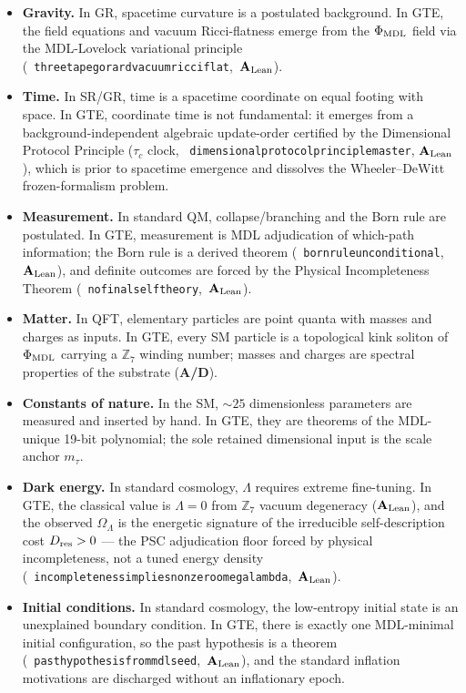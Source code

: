 \documentclass[11pt]{article}
\newcommand{\lean}[1]{%
  \penalty-100
  \begingroup\def\_{\textunderscore\allowbreak}\texttt{#1}\endgroup}
\newcommand{\CatAL}{\ensuremath{\textbf{A}_{\rm Lean}}}
\newcommand{\CatAD}{\textbf{A/D}}
\begin{document}
\begin{tcolorbox}[colback=blue!4,colframe=blue!50!black,breakable,
  title={GTE: Conceptual Reframings of Fundamental Physics}]
\small
\begin{itemize}[leftmargin=1.4em,itemsep=4pt]
\item \textbf{Gravity.}  In GR, spacetime curvature is a postulated background.  In
  GTE, the field equations and vacuum Ricci-flatness emerge from the
  $\Phi_{\rm MDL}$ field via the MDL-Lovelock variational principle
  \mbox{(\lean{three\_tape\_gorard\_vacuum\_ricci\_flat}, \CatAL)}.
\item \textbf{Time.}  In SR/GR, time is a spacetime coordinate on equal footing with
  space.  In GTE, coordinate time is not fundamental: it emerges from a
  background-independent algebraic update-order certified by the Dimensional
  Protocol Principle ($\tau_c$ clock,
  \mbox{\lean{dimensional\_protocol\_principle\_master}}, \CatAL), which is prior to
  spacetime emergence and dissolves the Wheeler--DeWitt frozen-formalism problem.
\item \textbf{Measurement.}  In standard QM, collapse/branching and the Born rule are
  postulated.  In GTE, measurement is MDL adjudication of which-path information;
  the Born rule is a derived theorem
  \mbox{(\lean{born\_rule\_unconditional}, \CatAL)}, and definite outcomes are forced
  by the Physical Incompleteness Theorem
  \mbox{(\lean{no\_final\_self\_theory}, \CatAL)}.
\item \textbf{Matter.}  In QFT, elementary particles are point quanta with masses and
  charges as inputs.  In GTE, every SM particle is a topological kink soliton of
  $\Phi_{\rm MDL}$ carrying a $\mathbb{Z}_7$ winding number; masses and charges are
  spectral properties of the substrate (\CatAD).
\item \textbf{Constants of nature.}  In the SM, $\sim 25$ dimensionless parameters are
  measured and inserted by hand.  In GTE, they are theorems of the MDL-unique 19-bit
  polynomial; the sole retained dimensional input is the scale anchor $m_\tau$.
\item \textbf{Dark energy.}  In standard cosmology, $\Lambda$ requires extreme
  fine-tuning.  In GTE, the classical value is $\Lambda = 0$ from $\mathbb{Z}_7$
  vacuum degeneracy (\CatAL), and the observed $\Omega_\Lambda$ is the energetic
  signature of the irreducible self-description cost $D_{\rm res} > 0$ --- the PSC
  adjudication floor forced by physical incompleteness, not a tuned energy density
  \mbox{(\lean{incompleteness\_implies\_nonzero\_omega\_lambda}, \CatAL)}.
\item \textbf{Initial conditions.}  In standard cosmology, the low-entropy initial
  state is an unexplained boundary condition.  In GTE, there is exactly one
  MDL-minimal initial configuration, so the past hypothesis is a theorem
  \mbox{(\lean{past\_hypothesis\_from\_mdl\_seed}, \CatAL)}, and the standard
  inflation motivations are discharged without an inflationary epoch.
\end{itemize}
\end{tcolorbox}
\end{document}
